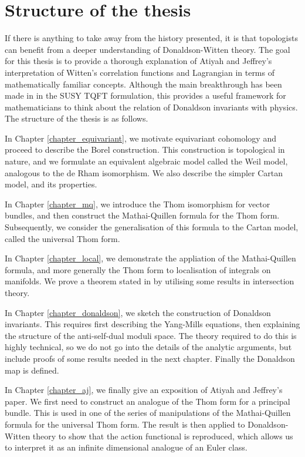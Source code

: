 \section*{Structure of the thesis}
If there is anything to take away from the history presented, it is that
topologists can benefit from a deeper understanding of Donaldson-Witten theory. 
The goal for this thesis is to provide a thorough explanation of Atiyah and
Jeffrey's interpretation of Witten's correlation functions and Lagrangian in
terms of mathematically familiar concepts. Although the main breakthrough has
been made in in the SUSY TQFT formulation, this provides a useful framework for
mathematicians to think about the relation of Donaldson invariants with physics. 
The structure of the thesis is as follows.

In Chapter \ref{chapter_equivariant}, we motivate 
equivariant cohomology and proceed to describe the Borel construction. This
construction is topological in nature, and we formulate an equivalent algebraic
model called the Weil model, analogous to the de Rham isomorphism. We also
describe the simpler Cartan model, and its properties.

In Chapter \ref{chapter_mq}, we introduce the Thom isomorphism for vector
bundles, and then construct the Mathai-Quillen formula for the Thom form. 
Subsequently, we consider the generalisation of this formula to the Cartan model, 
called the universal Thom form.

In Chapter \ref{chapter_local}, we demonstrate the appliation of the
Mathai-Quillen formula, and more generally the Thom form to localisation of
integrals on manifolds. We prove a theorem stated in \cite{bott_tu} by utilising
some results in intersection theory.

In Chapter \ref{chapter_donaldson}, we sketch the construction of Donaldson
invariants. This requires first describing the Yang-Mills equations, then
explaining the structure of the anti-self-dual moduli space. The theory required
to do this is highly technical, so we do not go into the details of the analytic
arguments, but include proofs of some results needed in the next chapter. 
Finally the Donaldson map is defined. 

In Chapter \ref{chapter_aj}, we finally give an exposition of Atiyah and
Jeffrey's paper.\cite{atiyahlagrangians} We first need to construct an analogue
of the Thom form for a principal bundle. This is used in one of the series of
manipulations of the Mathai-Quillen formula for the universal Thom form. 
The result is then applied to Donaldson-Witten theory to show that the action 
functional is reproduced, which allows us to interpret it as an infinite
dimensional analogue of an Euler class. 

